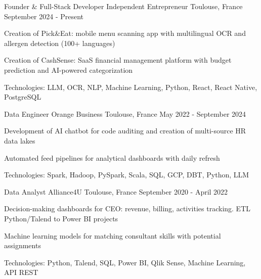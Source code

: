 


\begin{cventries}


\cventry
{Founder \& Full-Stack Developer} %
{Independent Entrepreneur} %
{Toulouse, France} %
{September 2024 - Present} %
{ %
\begin{cvitems}
\item {Creation of Pick\&Eat: mobile menu scanning app with multilingual OCR and allergen detection (100+ languages)}
\item {Creation of CashSense: SaaS financial management platform with budget prediction and AI-powered categorization}
\item {Technologies: LLM, OCR, NLP, Machine Learning, Python, React, React Native, PostgreSQL}
\end{cvitems}
}
\vspace{1.5em}


\cventry
{Data Engineer} %
{Orange Business} %
{Toulouse, France} %
{May 2022 - September 2024} %
{ %
\begin{cvitems}
\item {Development of AI chatbot for code auditing and creation of multi-source HR data lakes}
\item {Automated feed pipelines for analytical dashboards with daily refresh}
\item {Technologies: Spark, Hadoop, PySpark, Scala, SQL, GCP, DBT, Python, LLM}
\end{cvitems}
}
\vspace{1.5em}


\cventry
{Data Analyst} %
{Alliance4U} %
{Toulouse, France} %
{September 2020 - April 2022} %
{ %
\begin{cvitems}
\item {Decision-making dashboards for CEO: revenue, billing, activities tracking. ETL Python/Talend to Power BI projects}
\item {Machine learning models for matching consultant skills with potential assignments}
\item {Technologies: Python, Talend, SQL, Power BI, Qlik Sense, Machine Learning, API REST}
\end{cvitems}
}
\vspace{1.5em}


\end{cventries}
